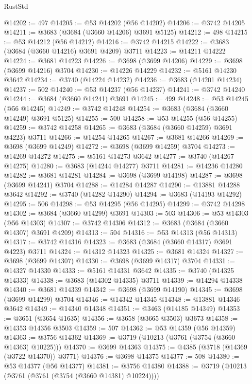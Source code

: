 \begin{lexlean}{RustStd}
\begin{coremodule}
{\begin{coremodule}
{{{{{{{{{{{{{{{{{{{{{{{{{{{{{{{{{{{{{{{{{{{{{{{@14202 := 497
@14205 := @53 @14202 (@56 @14202)
@14206 := @3742 @14205
@14211 := @3683 (@3684 (@3660 @14206) @3691 @5125)
@14212 := 498
@14215 := @53 @14212 (@56 @14212)
@14216 := @3742 @14215
@14222 := @3683 (@3684 (@3660 @14216) @3691 @4209) @3711
@14223 := @14211 @14222
@14224 := @3681 @14223
@14226 := @3698 (@3699 @14206)
@14229 := @3698 (@3699 @14216) @3704
@14230 := @14226 @14229
@14232 := @5161 @14230 @3642
@14234 := @3740 (@14224 @14232)
@14236 := @3683 (@14201 @14234)
@14237 := 502
@14240 := @53 @14237 (@56 @14237)
@14241 := @3742 @14240
@14244 := @3684 (@3660 @14241) @3691
@14245 := 499
@14248 := @53 @14245 (@56 @14245)
@14249 := @3742 @14248
@14254 := @3683 (@3684 (@3660 @14249) @3691 @5125)
@14255 := 500
@14258 := @53 @14255 (@56 @14255)
@14259 := @3742 @14258
@14265 := @3683 (@3684 (@3660 @14259) @3691 @4223) @3711
@14266 := @14254 @14265
@14267 := @3681 @14266
@14269 := @3698 (@3699 @14249)
@14272 := @3698 (@3699 @14259) @3704
@14273 := @14269 @14272
@14275 := @5161 @14273 @3642
@14277 := @3740 (@14267 @14275)
@14280 := @3683 (@14244 @14277) @3711
@14281 := @14236 @14280
@14282 := @3681 @14281
@14284 := @3698 (@3699 @14198)
@14287 := @3698 (@3699 @14241) @3704
@14288 := @14284 @14287
@14290 := @13881 @14288 @3642
@14292 := @3740 (@14282 @14290)
@14294 := @3683 (@14193 @14292)
@14295 := 506
@14298 := @53 @14295 (@56 @14295)
@14299 := @3742 @14298
@14302 := @3684 (@3660 @14299) @3691
@14303 := 503
@14306 := @53 @14303 (@56 @14303)
@14307 := @3742 @14306
@14312 := @3683 (@3684 (@3660 @14307) @3691 @4209)
@14313 := 504
@14316 := @53 @14313 (@56 @14313)
@14317 := @3742 @14316
@14323 := @3683 (@3684 (@3660 @14317) @3691 @4223) @3711
@14324 := @14312 @14323
@14325 := @3681 @14324
@14327 := @3698 (@3699 @14307)
@14330 := @3698 (@3699 @14317) @3704
@14331 := @14327 @14330
@14333 := @5161 @14331 @3642
@14335 := @3740 (@14325 @14333)
@14338 := @3683 (@14302 @14335) @3711
@14339 := @14294 @14338
@14340 := @3681 @14339
@14342 := @3698 (@3699 @14190)
@14345 := @3698 (@3699 @14299) @3704
@14346 := @14342 @14345
@14348 := @13881 @14346 @3642
@14349 := @14340 @14348
@14351 := @3463 (@14185 @14349)
@14353 := @3651 (@3654 @1635)
@14356 := @3658 (@3665 @3503) @3673
@14358 := @14353 @14356 @3503
@14359 := 507
@14362 := @53 @14359 (@56 @14359)
@14363 := @3756 @14362
@14369 := @3719 (@10213 (@3761 (@3754 (@3660 @14363) @10225)))
@14370 := @3699 @14363
@14375 := @4385 (@3718 (@14369 (@3722 @14370)) @3771)
@14376 := @3698 @14375
@14377 := 508
@14380 := @53 @14377 (@56 @14377)
@14381 := @3756 @14380
@14388 := @3719 (@10213 (@3761 (@3761 (@3754 (@3660 @14381) @10224))))
}}}}}}}}}}}}}}}}}}}}}}}}}}}}}}}}}}}}}}}}}}}}}}}
\end{coremodule}}
\end{coremodule}
\end{lexlean}
